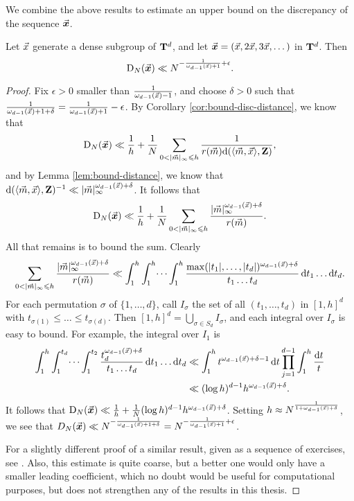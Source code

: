 We combine the above results to estimate an upper bound on the discrepancy of 
the sequence $\vec{\boldsymbol x}$. 

\begin{theorem}\label{thm:disc-upper-bound}
Let $\vec{x}$ generate a dense subgroup of $\mathbf{T}^d$, and let 
$\vec{\boldsymbol x}=(\vec{x},2\vec{x},3\vec{x},\dots)$ in $\mathbf{T}^d$. Then 
\[
	\operatorname{D}_N(\vec{\boldsymbol x}) \ll N^{-\frac{1}{\omega_{d-1}(\vec{x})+1}+\epsilon} .
\]
\end{theorem}
\begin{proof}
Fix $\epsilon>0$ smaller than $\frac{1}{\omega_{d-1}(\vec{x}) - 1}$, and choose 
$\delta>0$ such that 
$\frac{1}{\omega_{d-1}(\vec{x})+1+\delta} = \frac{1}{\omega_{d-1}(\vec{x})+1} - \epsilon$. 
By Corollary \ref{cor:bound-disc-distance}, we know that 
\[
	\D_N(\bvx) \ll \frac 1 h + \frac 1 N \sum_{0<|\vm|_\infty \leqslant h} \frac{1}{r(\vm) \dd(\langle \vm,\vx\rangle,\bZ)} ,
\]
and by Lemma \ref{lem:bound-distance}, we know that 
$\mathrm{d}(\langle \vec{m},\vec{x}\rangle,\mathbf{Z})^{-1} \ll |\vec{m}|_\infty^{\omega_{d-1}(\vec{x})+\delta}$. 
It follows that 
\[
	\operatorname{D}_N(\vec{\boldsymbol x}) \ll \frac 1 h + \frac 1 N \sum_{0 < |\vec{m}|_\infty \leqslant h} \frac{|\vec{m}|_\infty^{\omega_{d-1}(\vec{x})+\delta}}{r(\vec{m})} .
\]
All that remains is to bound the sum. Clearly 
\[
	\sum_{0 < |\vec{m}|_\infty \leqslant h} \frac{|\vec{m}|_\infty^{\omega_{d-1}(\vec{x}) + \delta}}{r(\vec{m})} \ll \int_1^h \int_1^h \dots \int_1^h \frac{\max(|t_1|,\dots,|t_d|)^{\omega_{d-1}(\vec{x})+\delta}}{t_1 \dots t_d}\, \mathrm{d} t_1 \dots \mathrm{d} t_d .
\]
For each permutation $\sigma$ of $\{1,\dots,d\}$, call $I_\sigma$ the set of 
all $(t_1,\dots,t_d)$ in $[1,h]^d$ with 
$t_{\sigma(1)} \leqslant \dots \leqslant t_{\sigma(d)}$. Then 
$[1,h]^d = \bigcup_{\sigma\in S_d} I_\sigma$, and each integral over 
$I_\sigma$ is easy to bound. For example, the integral over $I_1$ is 
\begin{align*}
	\int_1^h \int_1^{t_d} \dots \int_1^{t_2} \frac{t_d^{\omega_{d-1}(\vec{x})+\delta}}{t_1 \dots t_d}\, \mathrm{d} t_1 \dots \mathrm{d} t_d 
		&\ll \int_1^h t^{\omega_{d-1}(\vec{x})+\delta-1}\, \mathrm{d} t \prod_{j=1}^{d-1} \int_1^h \frac{\mathrm{d} t}{t} \\
		&\ll (\log h)^{d-1} h^{\omega_{d-1}(\vec{x})+\delta} .
\end{align*}
It follows that 
$\operatorname{D}_N(\vec{\boldsymbol x}) \ll \frac 1 h + \frac 1 N (\log h)^{d-1} h^{\omega_{d-1}(\vec{x})+\delta}$. 
Setting $h\approx N^{\frac{1}{1+\omega_{d-1}(\vec{x})+\delta}}$, we see that 
$D_N(\vec{\boldsymbol x}) \ll N^{-\frac{1}{\omega_{d-1}(\vec{x})+1+\delta}} = N^{-\frac{1}{\omega_{d-1}(\vec{x})+1} + \epsilon}$. 

For a slightly different proof of a similar result, given as a sequence of 
exercises, see  \cite[Ch.~2, Ex.~3.15, 16, 17]{kuipers-niederreiter-1974}. 
Also, this estimate is quite coarse, but a better one would only have a smaller 
leading coefficient, which no doubt would be useful for computational 
purposes, but does not strengthen any of the results in this thesis.  
\end{proof}

